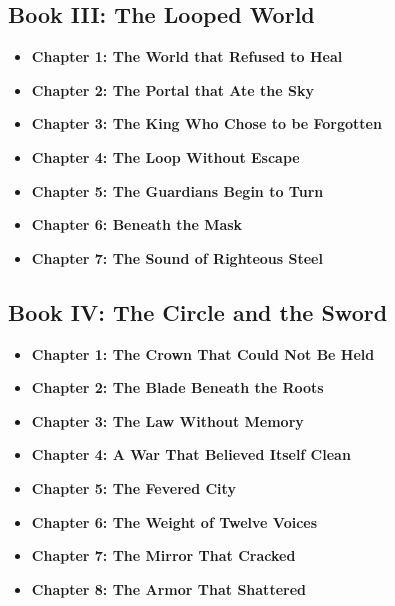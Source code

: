 \documentclass[12pt]{article}
\begin{document}
\newpage

\begin{titlepage}
\vspace*{2em}
\subsection*{Book III: The Looped World}
\begin{itemize}
  \item \textbf{Chapter 1: The World that Refused to Heal}
  \item \textbf{Chapter 2: The Portal that Ate the Sky}
  \item \textbf{Chapter 3: The King Who Chose to be Forgotten}
  \item \textbf{Chapter 4: The Loop Without Escape}
  \item \textbf{Chapter 5: The Guardians Begin to Turn}
  \item \textbf{Chapter 6: Beneath the Mask}
  \item \textbf{Chapter 7: The Sound of Righteous Steel}
\end{itemize}

\vspace{.5in}

\subsection*{Book IV: The Circle and the Sword}
\begin{itemize}
  \item \textbf{Chapter 1: The Crown That Could Not Be Held}
  \item \textbf{Chapter 2: The Blade Beneath the Roots}
  \item \textbf{Chapter 3: The Law Without Memory}
  \item \textbf{Chapter 4: A War That Believed Itself Clean}
  \item \textbf{Chapter 5: The Fevered City}
  \item \textbf{Chapter 6: The Weight of Twelve Voices}
  \item \textbf{Chapter 7: The Mirror That Cracked}
  \item \textbf{Chapter 8: The Armor That Shattered}
\end{itemize}
\end{titlepage}

\newpage
\end{document}

